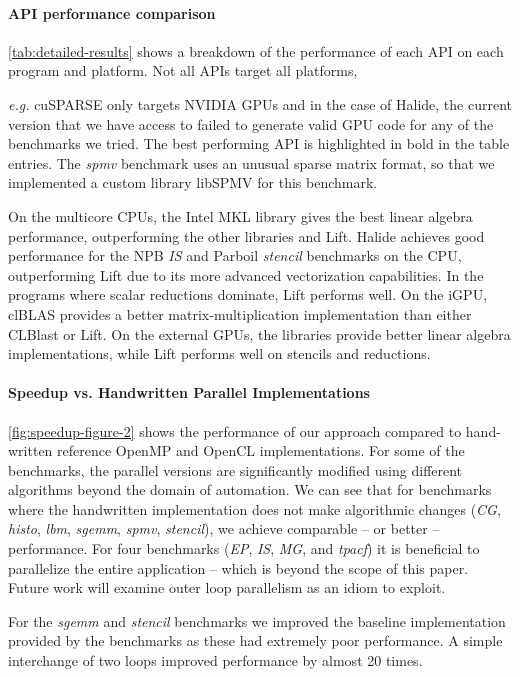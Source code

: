 \paragraph*{API performance comparison}
\autoref{tab:detailed-results} shows a breakdown of the performance of each API on each program and platform.
Not all APIs
target all platforms, {\emph{e.g.} cuSPARSE only targets NVIDIA GPUs and in the
case of Halide, the current version that we have access to failed to generate
valid GPU code for any of the benchmarks we tried.
The best performing API is highlighted in bold in the table entries.
The \emph{spmv} benchmark uses an unusual sparse matrix format, so that we
implemented a custom library libSPMV for this benchmark.

On the multicore CPUs, the Intel MKL library gives the best linear algebra performance, outperforming the other libraries and Lift.
Halide achieves good performance for the NPB \emph{IS} and Parboil \emph{stencil} benchmarks on the CPU, outperforming Lift due to its more advanced vectorization capabilities.
In the programs where scalar reductions dominate, Lift performs well.
On the iGPU, clBLAS provides a better matrix-multiplication implementation than either CLBlast or Lift.
On the external GPUs, the libraries provide better linear algebra implementations, while Lift performs well on stencils and reductions.

\paragraph*{Speedup vs. Handwritten Parallel Implementations}
\autoref{fig:speedup-figure-2} shows the performance of our approach compared to hand-written reference OpenMP and OpenCL implementations.
For some of the benchmarks, the parallel versions are significantly modified using different algorithms beyond the domain of automation.
We can see that for benchmarks where the handwritten implementation does not make algorithmic changes (\emph{CG}, \emph{histo}, \emph{lbm}, \emph{sgemm}, \emph{spmv}, \emph{stencil}), we achieve comparable -- or better -- performance.
For four benchmarks (\emph{EP}, \emph{IS}, \emph{MG}, and \emph{tpacf}) it is beneficial to parallelize the entire application -- which is beyond the scope of this paper. Future work will examine outer loop parallelism as an idiom to exploit.

For the \emph{sgemm} and \emph{stencil} benchmarks we improved the baseline implementation provided by the benchmarks as these had extremely poor performance.
A simple interchange of two loops improved performance by almost 20 times.

}
